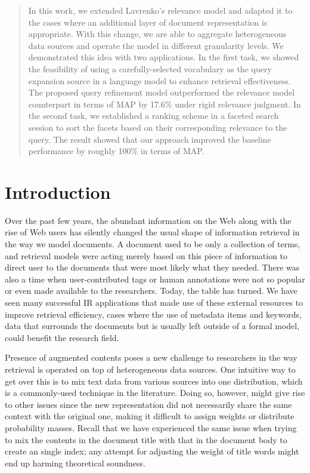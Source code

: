 \begin{abstract} In this work, we extended Lavrenko's relevance model
\cite{lavrenko2001relevance} and adapted it to the cases where an additional
layer of document representation is appropriate.  With this change, we are able
to aggregate heterogeneous data sources and operate the model in different
granularity levels.  We demonstrated this idea with two applications.  In the
first task, we showed the feasibility of using a carefully-selected vocabulary
as the query expansion source in a language model to enhance retrieval
effectiveness.  The proposed query refinement model outperformed the relevance
model counterpart in terms of MAP by 17.6\% under rigid relevance judgment.  In
the second task, we established a ranking scheme in a faceted search session to
sort the facets based on their corresponding relevance to the query.  The
result showed that our approach improved the baseline performance by roughly
100\% in terms of MAP.   \end{abstract}

\section{Introduction}

Over the past few years, the abundant information on the Web along with the
rise of Web users has silently changed the usual shape of information retrieval
in the way we model documents.  A document used to be only a collection of
terms, and retrieval models were acting merely based on this piece of
information to direct user to the documents that were most likely what they
needed.  There was also a time when user-contributed tags or human annotations
were not so popular or even made available to the researchers.  Today, the
table has turned.  We have seen many successful IR applications that made use
of these external resources to improve retrieval efficiency, cases where the
use of metadata items and keywords, data that surrounds the documents but is
usually left outside of a formal model, could benefit the research field.  

Presence of augmented contents poses a new challenge to researchers in the way
retrieval is operated on top of heterogeneous data sources.  One intuitive way
to get over this is to mix text data from various sources into one
distribution, which is a commonly-used technique in the literature.  Doing so,
however, might give rise to other issues since the new representation did not
necessarily share the same context with the original one, making it difficult
to assign weights or distribute probability masses.  Recall that we have
experienced the same issue when trying to mix the contents in the document
title with that in the document body to create an single index; any attempt for
adjusting the weight of title words might end up harming theoretical soundness.

